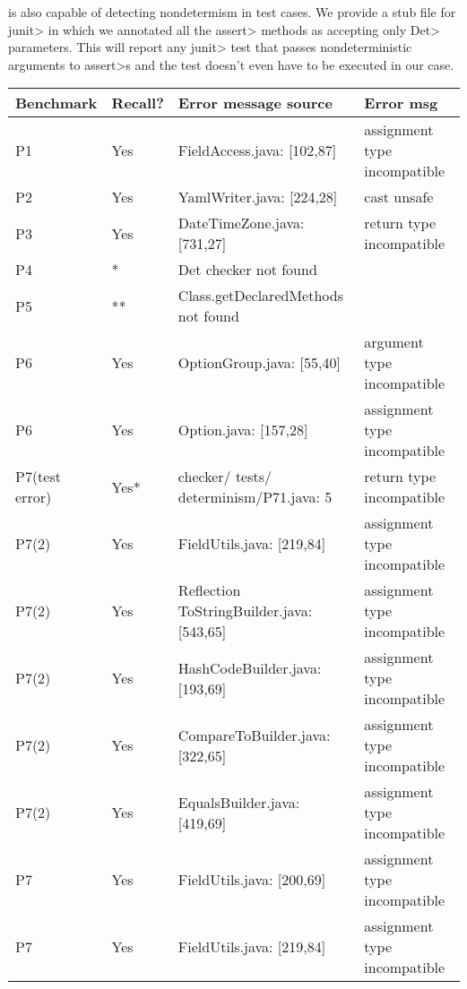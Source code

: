 \TheDeterminismChecker is also capable of detecting nondetermism in test cases. We provide a stub file
for \<junit> in which we annotated all the \<assert> methods as accepting only \<Det> parameters.
This will report any \<junit> test that passes nondeterministic arguments to \<assert>s and the test doesn't
even have to be executed in our case.

\begin{table}[]
    \begin{tabular}{|p{1.5cm}|p{1cm}|p{4cm}|p{5cm}|}
        \hline
        Benchmark & Recall? & Error message source & Error msg  \\ \hline
        P1 & Yes & FieldAccess.java: [102,87] & assignment type incompatible \\
        P2 & Yes & YamlWriter.java: [224,28] & cast unsafe  \\
        P3 & Yes & DateTimeZone.java: [731,27] &  return type incompatible \\ 
        P4 & * & Det checker not found  &   \\ 
        P5 & ** & Class.getDeclaredMethods not found &    \\ 
        P6 & Yes & OptionGroup.java: [55,40]  & argument type incompatible \\ 
        P6 & Yes & Option.java: [157,28]  &  assignment type incompatible\\
        P7(test error) & Yes* & checker/ tests/ determinism/P71.java: 5 & return type incompatible \\ 
        P7(2) & Yes & FieldUtils.java: [219,84] & assignment type incompatible \\
        P7(2) & Yes & Reflection ToStringBuilder.java: [543,65]  & assignment type incompatible  \\
        P7(2) & Yes & HashCodeBuilder.java: [193,69]  & assignment type incompatible   \\
        P7(2) & Yes & CompareToBuilder.java: [322,65] & assignment type incompatible   \\
        P7(2) & Yes & EqualsBuilder.java: [419,69]  & assignment type incompatible  \\
        P7 & Yes & FieldUtils.java: [200,69] & assignment type incompatible \\
        P7 & Yes & FieldUtils.java: [219,84] & assignment type incompatible  \\

\end{tabular}
\end{table}
